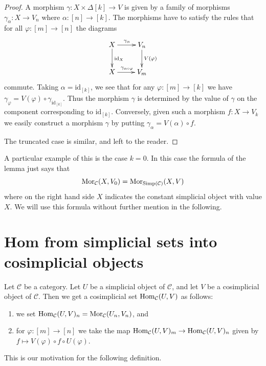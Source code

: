 \begin{proof}
A morphism $\gamma : X \times \Delta[k] \to V$ is given by
a family of morphisms $\gamma_\alpha : X \to V_n$ where
$\alpha : [n] \to [k]$. The morphisms have to satisfy the
rules that for all $\varphi : [m] \to [n]$ the diagrams
$$
\xymatrix{
X \ar[r]^{\gamma_\alpha} \ar[d]^{\text{id}_X} & V_n \ar[d]^{V(\varphi)} \\
X \ar[r]^{\gamma_{\alpha \circ \varphi}} & V_m
}
$$
commute. Taking $\alpha = \text{id}_{[k]}$, we see that
for any $\varphi : [m] \to [k]$ we have $\gamma_\varphi =
V(\varphi) \circ \gamma_{\text{id}_{[k]}}$. Thus the morphism
$\gamma$ is determined by the value of $\gamma$ on the
component corresponding to $\text{id}_{[k]}$. Conversely,
given such a morphism $f : X \to V_k$ we easily
construct a morphism $\gamma$ by putting
$\gamma_\alpha = V(\alpha) \circ f$.

\medskip\noindent
The truncated case is similar, and left to the reader.
\end{proof}

\noindent
A particular example of this is the case $k = 0$.
In this case the formula of the lemma just says
that
$$
\mathop{\mathrm{Mor}}\nolimits_\mathcal{C}(X, V_0)
=
\mathop{\mathrm{Mor}}\nolimits_{\text{Simp}(\mathcal{C})}(X, V)
$$
where on the right hand side $X$ indicates the
constant simplicial object with value $X$. We will
use this formula without further mention in the
following.




\section{Hom from simplicial sets into cosimplicial objects}
\label{section-hom-from-simplicial-sets-into-cosimplicial}

\noindent
Let $\mathcal{C}$ be a category.
Let $U$ be a simplicial object of $\mathcal{C}$,
and let $V$ be a cosimplicial object of $\mathcal{C}$.
Then we get a cosimplicial set $\mathop{\mathrm{Hom}}\nolimits_\mathcal{C}(U, V)$
as follows:
\begin{enumerate}
\item we set
$\mathop{\mathrm{Hom}}\nolimits_\mathcal{C}(U, V)_n = \mathop{\mathrm{Mor}}\nolimits_\mathcal{C}(U_n, V_n)$, and
\item for $\varphi : [m] \to [n]$ we take the map
$\mathop{\mathrm{Hom}}\nolimits_\mathcal{C}(U, V)_m \to \mathop{\mathrm{Hom}}\nolimits_\mathcal{C}(U, V)_n$
given by $f \mapsto V(\varphi) \circ f \circ U(\varphi)$.
\end{enumerate}
This is our motivation for the following definition.

